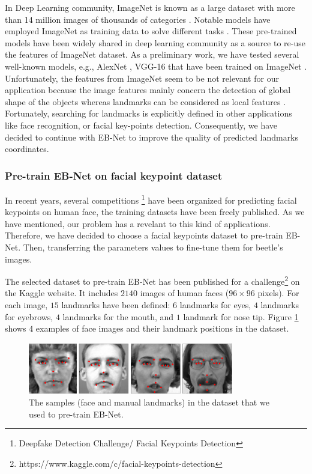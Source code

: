 \documentclass[review]{elsarticle}
\begin{document}
In Deep Learning community, ImageNet is known as a large dataset with more than 14 million images of thousands of categories \cite{deng2009imagenet}. Notable models have employed ImageNet as training data to solve different tasks \cite{krizhevsky2012imagenet, simonyan2014very}. These pre-trained models have been widely shared in deep learning community as a source to re-use the features of ImageNet dataset. As a preliminary work, we have tested several well-known models, e.g., AlexNet \cite{krizhevsky2012imagenet}, VGG-16 \cite{simonyan2014very} that have been trained on ImageNet \cite{deng2009imagenet}. Unfortunately, the features from ImageNet seem to be not relevant for our application because the image features mainly concern the detection of global shape of the objects whereas landmarks can be considered as local features \cite{lin2016homemade}. Fortunately, searching for landmarks is explicitly defined in other applications like face recognition, or facial key-points detection. Consequently, we have decided to continue with EB-Net to improve the quality of predicted landmarks coordinates.

\subsubsection{Pre-train EB-Net on facial keypoint dataset}
In recent years, several competitions \footnote{Deepfake Detection Challenge/ Facial Keypoints Detection} have been organized for predicting facial keypoints on human face, the training datasets have been freely published. As we have mentioned, our problem has a revelant to this kind of applications. Therefore, we have decided to choose a facial keypoints dataset to pre-train EB-Net. Then, transferring the parameters values to fine-tune them for beetle's images.

The selected dataset to pre-train EB-Net has been published for a challenge\footnote{https://www.kaggle.com/c/facial-keypoints-detection} on the Kaggle website. It includes $2140$ images of human faces ($96 \times 96$ pixels). For each image, $15$ landmarks have been defined: $6$ landmarks for eyes, $4$ landmarks for eyebrows, $4$ landmarks for the mouth, and $1$ landmark for nose tip. Figure \ref{fighmface} shows $4$ examples of face images and their landmark positions in the dataset.

\begin{figure}[h!]
	\centering
	\includegraphics[width=0.80\textwidth]{images/face_dataset_2}
	\caption{The samples (face and manual landmarks) in the dataset that we used to pre-train EB-Net.}
	\label{fighmface}
\end{figure}
\end{document}
